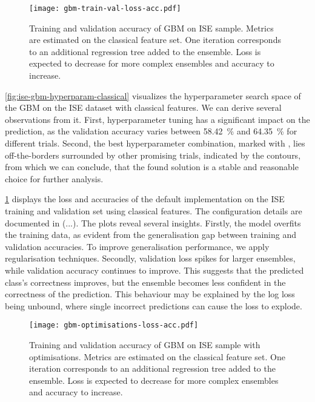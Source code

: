 \begin{figure}[ht]
    \centering
    \texttt{[image: gbm-train-val-loss-acc.pdf]}
    \caption[Training and Validation Accuracy of  on  Sample]{Training and validation accuracy of \gls{GBM} on \gls{ISE} sample. Metrics are estimated on the classical feature set. One iteration corresponds to an additional regression tree added to the ensemble. Loss is expected to decrease for more complex ensembles and accuracy to increase.}
    \label{fig:gbm-train-val-loss-acc}
\end{figure}
\cref{fig:ise-gbm-hyperparam-classical} visualizes the hyperparameter search space of the \gls{GBM} on the \gls{ISE} dataset with classical features. We can derive several observations from it. First, hyperparameter tuning has a significant impact on the prediction, as the validation accuracy varies between \SI{58.42}{\percent} and \SI{64.35}{\percent} for different trials. Second, the best hyperparameter combination, marked with \bestcircle, lies off-the-borders surrounded by other promising trials, indicated by the contours, from which we can conclude, that the found solution is a stable and reasonable choice for further analysis.

\cref{fig:gbm-train-val-loss-acc} displays the loss and accuracies of the default implementation on the \gls{ISE} training and validation set using classical features. The configuration details are documented in (...). The plots reveal several insights. Firstly, the model overfits the training data, as evident from the generalisation gap between training and validation accuracies. To improve generalisation performance, we apply regularisation techniques. Secondly, validation loss spikes for larger ensembles, while validation accuracy continues to improve. This suggests that the predicted class's correctness improves, but the ensemble becomes less confident in the correctness of the prediction. This behaviour may be explained by the log loss being unbound, where single incorrect predictions can cause the loss to explode.


\begin{figure}[ht]
    \centering
    \texttt{[image: gbm-optimisations-loss-acc.pdf]}
    \caption[Training and Validation Accuracy of  on  with Optimisations]{Training and validation accuracy of \gls{GBM} on \gls{ISE} sample with optimisations. Metrics are estimated on the classical feature set. One iteration corresponds to an additional regression tree added to the ensemble. Loss is expected to decrease for more complex ensembles and accuracy to increase.}
    \label{fig:gbm-optimisations-loss-acc}
\end{figure}


